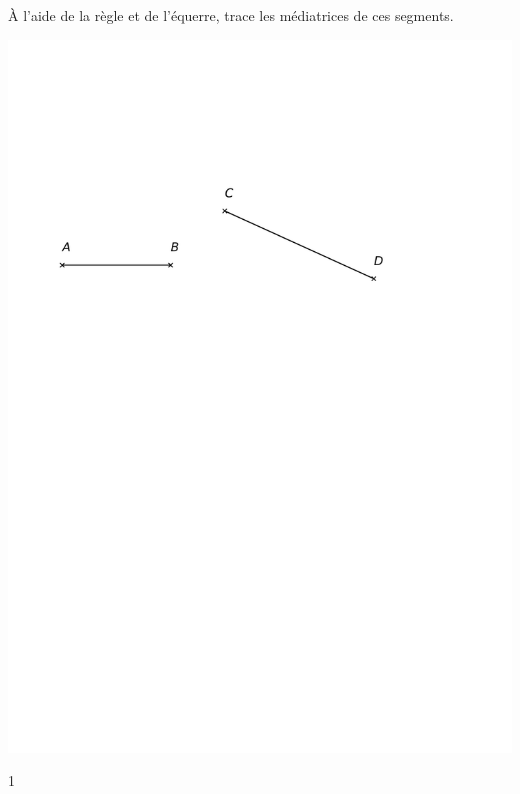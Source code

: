 \documentclass[a4paper,11pt]{report}
\begin{document}
\begin{exop}
{
À l'aide de la règle et de l'équerre, trace les médiatrices de ces segments.
\begin{center}
	\includegraphics[scale=1]{media/es-10/12-7}
\end{center}
\vspace{2cm}
%
%
\vspace{2cm}
}
{1}
\end{exop}
\end{document}
